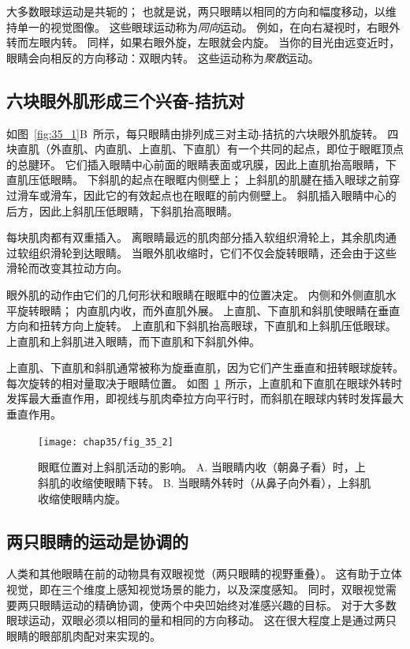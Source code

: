 大多数眼球运动是共轭的；
也就是说，两只眼睛以相同的方向和幅度移动，以维持单一的视觉图像。
这些眼球运动称为\textit{同向}运动。
例如，在向右凝视时，右眼外转而左眼内转。
同样，如果右眼外旋，左眼就会内旋。
当你的目光由远变近时，眼睛会向相反的方向移动：双眼内转。
这些运动称为\textit{聚散}运动。



\subsection{六块眼外肌形成三个兴奋-拮抗对}

如图~\ref{fig:35_1}B~所示，每只眼睛由排列成三对主动-拮抗的六块眼外肌旋转。
四块直肌（外直肌、内直肌、上直肌、下直肌）有一个共同的起点，即位于眼眶顶点的总腱环。
它们插入眼睛中心前面的眼睛表面或巩膜，因此上直肌抬高眼睛，下直肌压低眼睛。
下斜肌的起点在眼眶内侧壁上；
上斜肌的肌腱在插入眼球之前穿过滑车或滑车，因此它的有效起点也在眼眶的前内侧壁上。
斜肌插入眼睛中心的后方，因此上斜肌压低眼睛，下斜肌抬高眼睛。


每块肌肉都有双重插入。
离眼睛最远的肌肉部分插入软组织滑轮上，其余肌肉通过软组织滑轮到达眼睛。
当眼外肌收缩时，它们不仅会旋转眼睛，还会由于这些滑轮而改变其拉动方向。


眼外肌的动作由它们的几何形状和眼睛在眼眶中的位置决定。
内侧和外侧直肌水平旋转眼睛；
内直肌内收，而外直肌外展。
上直肌、下直肌和斜肌使眼睛在垂直方向和扭转方向上旋转。
上直肌和下斜肌抬高眼球，下直肌和上斜肌压低眼球。
上直肌和上斜肌进入眼睛，而下直肌和下斜肌外伸。


上直肌、下直肌和斜肌通常被称为旋垂直肌，因为它们产生垂直和扭转眼球旋转。
每次旋转的相对量取决于眼睛位置。
如图~\ref{fig:35_2}~所示，上直肌和下直肌在眼球外转时发挥最大垂直作用，即视线与肌肉牵拉方向平行时，而斜肌在眼球内转时发挥最大垂直作用。


\begin{figure}[htbp]
	\centering
	\texttt{[image: chap35/fig\_35\_2]}
	\caption{眼眶位置对上斜肌活动的影响。
		A. 当眼睛内收（朝鼻子看）时，上斜肌的收缩使眼睛下转。
		B. 当眼睛外转时（从鼻子向外看），上斜肌收缩使眼睛内旋。}
	\label{fig:35_2}
\end{figure}



\subsection{两只眼睛的运动是协调的}

人类和其他眼睛在前的动物具有双眼视觉（两只眼睛的视野重叠）。
这有助于立体视觉，即在三个维度上感知视觉场景的能力，以及深度感知。
同时，双眼视觉需要两只眼睛运动的精确协调，使两个中央凹始终对准感兴趣的目标。
对于大多数眼球运动，双眼必须以相同的量和相同的方向移动。 
这在很大程度上是通过两只眼睛的眼部肌肉配对来实现的。


